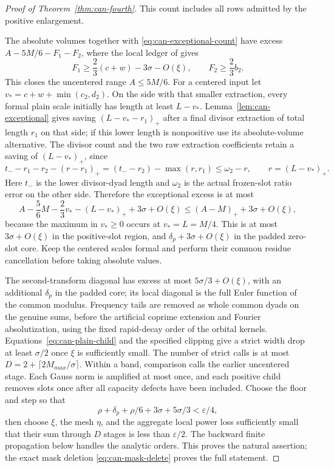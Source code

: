 \documentclass[11pt,a4paper]{article}
\numberwithin{equation}{section}
\theoremstyle{definition}
\theoremstyle{remark}
\newcommand{\eps}{\varepsilon}
\begin{document}
\begin{proof}[Proof of Theorem~\ref{thm:can-fourth}]
This count includes all rows admitted by the positive enlargement.

The absolute volumes together with
\eqref{eq:can-exceptional-count} have excess
$A-5M/6-F_1-F_2$, where the local ledger of
\cite[(18.42)--(18.44)]{Q} gives
\[
 F_1\ge\frac23(c+w)-3\sigma-O(\xi),\qquad
 F_2\ge\frac23b_2.
\]
This closes the uncentered range $A\le5M/6$.
For a centered input let
$v_*=c+w+\min(c_2,d_2)$.
On the side with that smaller extraction, every formal plain
scale initially has length at least $L-v_*$.
Lemma~\ref{lem:can-exceptional} gives saving
$(L-v_* -r_1)_+$ after a final divisor extraction of total
length $r_1$ on that side; if this lower length is nonpositive
use its absolute-volume alternative.
The divisor count and the two raw extraction coefficients
retain a saving of $(L-v_*)_+$, since
\[
 t_- -r_1-r_2-(r-r_1)_+
       =(t_- -r_2)-\max(r,r_1)\le\omega_2-r,
 \qquad r=(L-v_*)_+.
\]
Here $t_-$ is the lower divisor-dyad length and $\omega_2$ is
the actual frozen-slot ratio error on the other side.
Therefore the exceptional excess is at most
\[
 A-\frac56M-\frac23v_*-(L-v_*)_++3\sigma+O(\xi)
 \le(A-M)_++3\sigma+O(\xi),
\]
because the maximum in $v_*\ge0$ occurs at $v_*=L=M/4$.
This is at most $3\sigma+O(\xi)$ in the positive-slot region,
and $\delta_p+3\sigma+O(\xi)$ in the padded zero-slot core.
Keep the centered scales formal and perform their common residue
cancellation before taking absolute values.

The second-transform diagonal has excess at most
$5\sigma/3+O(\xi)$, with an additional $\delta_p$ in the
padded core; its local diagonal is the full Euler function
of the common modulus.  Frequency tails are removed as
whole common dyads on the genuine sums, before the artificial
coprime extension and Fourier absolutization, using the fixed
rapid-decay order of the orbital kernels.
Equations~\eqref{eq:can-plain-child} and the specified clipping
give a strict width drop at least $\sigma/2$ once
$\xi$ is sufficiently small.
The number of strict calls is at most
$D=2+\lceil2M_{max}/\sigma\rceil$.
Within a band, comparison calls the earlier uncentered stage. Each
Gauss norm is amplified at most once, and each positive child removes
slots once after all capacity defects have been included.
Choose the floor and step so that
\[
 \rho+\delta_p+\rho/6+3\sigma+5\sigma/3<\eps/4,
\]
then choose $\xi$, the mesh $\eta$, and the aggregate local
power loss sufficiently small that their sum through $D$
stages is less than $\eps/2$.
The backward finite propagation below handles the analytic
orders.  This proves the natural assertion; the exact mask
deletion \eqref{eq:can-mask-delete} proves the full statement.


\end{proof}
\end{document}
